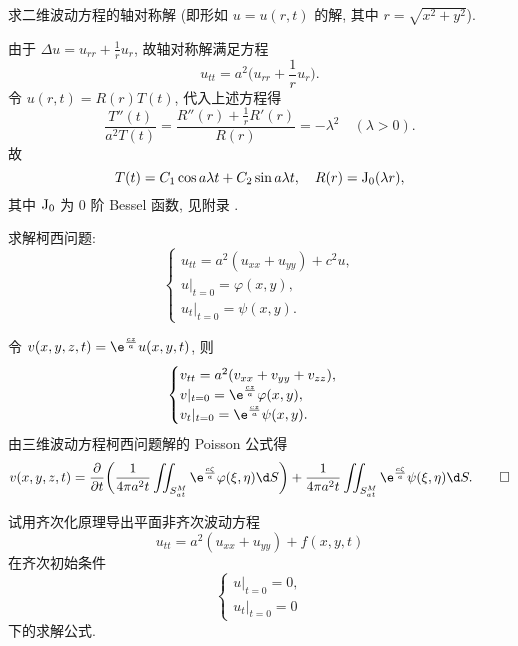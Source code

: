 \begin{exercise}
  求二维波动方程的轴对称解 (即形如 $u=u(r,t)$ 的解, 其中 $r=\sqrt{x^2+y^2}$).
\end{exercise}

\begin{solve}
  由于 $\Delta u = u_{rr} + \frac{1}{r}u_r$, 故轴对称解满足方程
  \[u_{tt} = a^2\biggl(u_{rr}+\frac{1}{r}u_r\biggr).\]
  令 $u(r,t) = R(r)T(t)$, 代入上述方程得
  \[\frac{T''(t)}{a^2T(t)} = \frac{R''(r)+\frac{1}{r}R'(r)}{R(r)} = -\lambda^2
    \quad (\lambda>0).\]
  故
  \[T(t) = C_1\cos a\lambda t + C_2\sin a\lambda t,
    \quad R(r) = {\rm J}_0(\lambda r),\]
  其中 ${\rm J}_0$ 为 0 阶 Bessel 函数, 见附录 \uppercase\expandafter{}.
\end{solve}


\begin{exercise}
  求解柯西问题:
  \[\begin{cases}
    u_{tt} = a^2(u_{xx}+u_{yy}) + c^2u, \\
    u|_{t=0} = \varphi(x,y), \\
    u_t|_{t=0} = \psi(x,y).
  \end{cases}\]
\end{exercise}

\begin{solve}
  令 $v(x,y,z,t) = \e^{\frac{cz}{a}} u(x,y,t)$, 则
  \[\begin{cases}
    v_{tt} = a^2(v_{xx} + v_{yy} + v_{zz}), \\
    v|_{t=0} = \e^{\frac{cz}{a}}\varphi(x,y), \\
    v_t|_{t=0} = \e^{\frac{cz}{a}}\psi(x,y).
  \end{cases}\]
  由三维波动方程柯西问题解的 Poisson 公式得
  \[ v(x,y,z,t) = \frac{\partial}{\partial t}
    \biggl(\frac{1}{4\pi a^2t}\iint_{S_{at}^M} \e^{\frac{c\zeta}{a}}\varphi(\xi,\eta)\d S\biggr)
    + \frac{1}{4\pi a^2t}\iint_{S_{at}^M} \e^{\frac{c\zeta}{a}}\psi(\xi,\eta)\d S. \qedhere \]
\end{solve}


\begin{exercise}[6]
  试用齐次化原理导出平面非齐次波动方程
  \[u_{tt} = a^2(u_{xx}+u_{yy})+f(x,y,t)\]
  在齐次初始条件
  \[\begin{cases}
    u|_{t=0} = 0, \\
    u_t|_{t=0} = 0
  \end{cases}\]
  下的求解公式.
\end{exercise}

